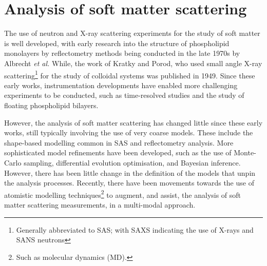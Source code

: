 \section{Analysis of soft matter scattering}
The use of neutron and X-ray scattering experiments for the study of soft matter is well developed, with early research into the structure of phospholipid monolayers by reflectometry methods being conducted in the late 1970s by Albrecht \emph{et al.}\autocite{albrecht_polymorphism_1978}
While, the work of Kratky and Porod,\autocite{kratky_diffuse_1949} who used small angle X-ray scattering\footnote{Generally abbreviated to SAS; with SAXS indicating the use of X-rays and SANS neutrons} for the study of colloidal systems was published in 1949.
Since these early works, instrumentation developments have enabled more challenging experiments to be conducted, such as time-resolved studies \autocite{jensen_monitoring_2014} and the study of floating phospholipid bilayers.\autocite{rondelli_reflectivity_2012}

However, the analysis of soft matter scattering has changed little since these early works, still typically involving the use of very coarse models.
These include the shape-based modelling common in SAS \autocite[][see Section~\ref{sec:sasanal}]{hassan_small_2003} and reflectometry analysis.\autocite[][see Section~\ref{sec:sasanal}]{campbell_structure_2018,lu_analysis_1996}
More sophisticated model refinements have been developed, such as the use of Monte-Carlo sampling,\autocite{pedersen_monte_2002} differential evolution optimisation,\autocite[abbreviated to DE]{wormington_characterization_1999} and Bayesian inference.\autocite{nelson_refnx_2019,larsen_analysis_2018}
However, there has been little change in the definition of the models that unpin the analysis processes.
Recently, there have been movements towards the use of atomistic modelling techniques\footnote{Such as molecular dynamics (MD).} to augment, and assist, the analysis of soft matter scattering measurements, in a multi-modal approach.\autocite{scoppola_combining_2018}

